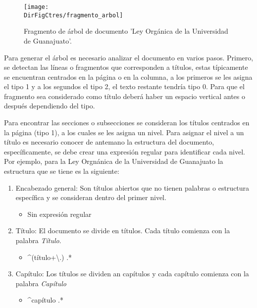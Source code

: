\begin{figure}[]
    \centering
    \texttt{[image: \\DirFigCtres/fragmento\_arbol]}
    \caption{Fragmento de árbol de documento 'Ley Orgánica de la Universidad de Guanajuato'.}
    \label{fig:fragmento_arbol}
\end{figure}

Para generar el árbol es necesario analizar el documento en varios pasos. Primero,
se detectan las líneas o fragmentos que corresponden a títulos, estas típicamente
se encuentran centrados en la página o en la columna, a los primeros se les
asigna el tipo 1 y a los segundos el tipo 2, el texto restante tendría tipo 0.
Para que el fragmento sea considerado como título deberá haber un espacio
vertical antes o después dependiendo del tipo.

Para encontrar las secciones o subsecciones se consideran los títulos
centrados en la página (tipo 1), a los cuales se les asigna un nivel. Para asignar
el nivel a un título es necesario conocer de antemano la estructura del
documento, específicamente, se debe crear una expresión regular para
identificar cada nivel. Por ejemplo, para la Ley Orgnánica de la Universidad
de Guanajuato la estructura que se tiene es la siguiente:

\begin{enumerate}
    \item Encabezado general: Son títulos abiertos que no tienen palabras o
          estructura específica y se consideran dentro del primer nivel.
          \begin{itemize}
              \item Sin expresión regular
          \end{itemize}
    \item Título: El documento se divide en títulos. Cada título comienza con
          la palabra \textit{Título}.
          \begin{itemize}
              \item \string^(título\textbar[xiv]+\textbackslash.) .*
          \end{itemize}
    \item Capítulo: Los títulos se dividen an capítulos y cada capítulo comienza
          con la palabra \textit{Capítulo}
          \begin{itemize}
              \item \string^capítulo .*
          \end{itemize}
\end{enumerate}

